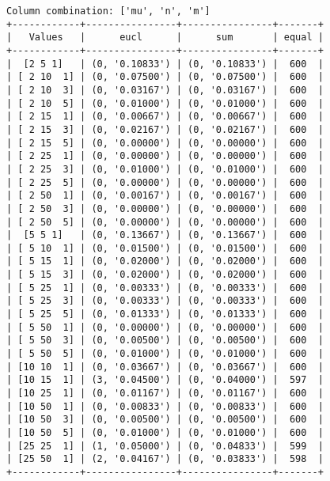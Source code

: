 \documentclass{article}
\begin{document}
\begin{verbatim}
Column combination: ['mu', 'n', 'm']
+------------+----------------+----------------+-------+
|   Values   |      eucl      |      sum       | equal |
+------------+----------------+----------------+-------+
|  [2 5 1]   | (0, '0.10833') | (0, '0.10833') |  600  |
| [ 2 10  1] | (0, '0.07500') | (0, '0.07500') |  600  |
| [ 2 10  3] | (0, '0.03167') | (0, '0.03167') |  600  |
| [ 2 10  5] | (0, '0.01000') | (0, '0.01000') |  600  |
| [ 2 15  1] | (0, '0.00667') | (0, '0.00667') |  600  |
| [ 2 15  3] | (0, '0.02167') | (0, '0.02167') |  600  |
| [ 2 15  5] | (0, '0.00000') | (0, '0.00000') |  600  |
| [ 2 25  1] | (0, '0.00000') | (0, '0.00000') |  600  |
| [ 2 25  3] | (0, '0.01000') | (0, '0.01000') |  600  |
| [ 2 25  5] | (0, '0.00000') | (0, '0.00000') |  600  |
| [ 2 50  1] | (0, '0.00167') | (0, '0.00167') |  600  |
| [ 2 50  3] | (0, '0.00000') | (0, '0.00000') |  600  |
| [ 2 50  5] | (0, '0.00000') | (0, '0.00000') |  600  |
|  [5 5 1]   | (0, '0.13667') | (0, '0.13667') |  600  |
| [ 5 10  1] | (0, '0.01500') | (0, '0.01500') |  600  |
| [ 5 15  1] | (0, '0.02000') | (0, '0.02000') |  600  |
| [ 5 15  3] | (0, '0.02000') | (0, '0.02000') |  600  |
| [ 5 25  1] | (0, '0.00333') | (0, '0.00333') |  600  |
| [ 5 25  3] | (0, '0.00333') | (0, '0.00333') |  600  |
| [ 5 25  5] | (0, '0.01333') | (0, '0.01333') |  600  |
| [ 5 50  1] | (0, '0.00000') | (0, '0.00000') |  600  |
| [ 5 50  3] | (0, '0.00500') | (0, '0.00500') |  600  |
| [ 5 50  5] | (0, '0.01000') | (0, '0.01000') |  600  |
| [10 10  1] | (0, '0.03667') | (0, '0.03667') |  600  |
| [10 15  1] | (3, '0.04500') | (0, '0.04000') |  597  |
| [10 25  1] | (0, '0.01167') | (0, '0.01167') |  600  |
| [10 50  1] | (0, '0.00833') | (0, '0.00833') |  600  |
| [10 50  3] | (0, '0.00500') | (0, '0.00500') |  600  |
| [10 50  5] | (0, '0.01000') | (0, '0.01000') |  600  |
| [25 25  1] | (1, '0.05000') | (0, '0.04833') |  599  |
| [25 50  1] | (2, '0.04167') | (0, '0.03833') |  598  |
+------------+----------------+----------------+-------+
\end{verbatim}
\end{document}
